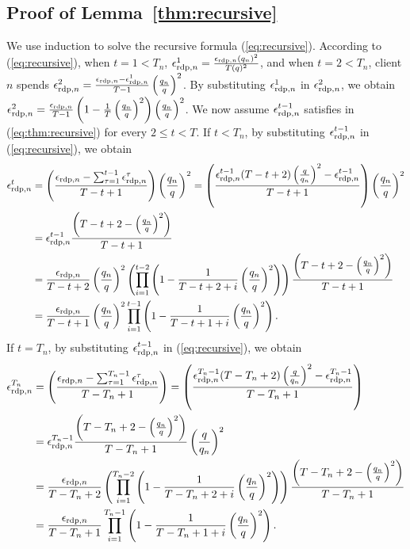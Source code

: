 \subsection{Proof of Lemma~\ref{thm:recursive}}\label{app:thm:recursive}
We use induction to solve the recursive formula (\ref{eq:recursive}). According to (\ref{eq:recursive}), when $t=1<T_n$, ${\epsilon}_{\text{rdp}, n}^1=\frac{{\epsilon}_{\text{rdp}, n}(q_n)^2}{T(q)^2}$, and when $t=2<T_n$, client $n$ spends ${\epsilon}_{\text{rdp}, n}^2 = \frac{{\epsilon}_{\text{rdp}, n}-{\epsilon}_{\text{rdp}, n}^1}{T-1} \left(\frac{q_n}{q}\right)^2$. By substituting ${\epsilon}_{\text{rdp}, n}^1$ in ${\epsilon}_{\text{rdp}, n}^2$, we obtain ${\epsilon}_{\text{rdp}, n}^2 = \frac{{\epsilon}_{\text{rdp}, n}}{T-1}\left(1-\frac{1}{T}\left(\frac{q_n}{q}\right)^2\right)\left(\frac{q_n}{q}\right)^2$. We now assume ${\epsilon}_{\text{rdp}, n}^{t-1}$ satisfies in (\ref{eq:thm:recursive}) for every $2 \leq t<T$. If $t< T_n$, by substituting ${\epsilon}_{\text{rdp}, n}^{t-1}$ in (\ref{eq:recursive}), we obtain
\begin{align}
    {\epsilon}_{\text{rdp}, n}^t &= \left(\frac{{\epsilon}_{\text{rdp}, n}-\sum_{\tau = 1}^{t-1} {\epsilon}_{\text{rdp}, n}^{\tau}}{T-t+1}\right)\left(\frac{q_n}{q}\right)^2
    = \left(\frac{{\epsilon}_{\text{rdp}, n}^{t-1}(T-t+2)\left(\frac{q}{q_n}\right)^2- {\epsilon}_{\text{rdp}, n}^{t-1}}{T-t+1}\right)\left(\frac{q_n}{q}\right)^2
    \\
    &= {\epsilon}_{\text{rdp}, n}^{t-1}\frac{\left(T-t+2-\left(\frac{q_n}{q}\right)^2\right)}{T-t+1}
    \\
    &= 
    \frac{{\epsilon}_{\text{rdp}, n}}{T-t+2}\left(\frac{q_n}{q}\right)^2\left(\prod_{i=1}^{t-2} \left(1-\frac{1}{T-t+2+i}\left(\frac{q_n}{q}\right)^2\right)\right)\frac{\left(T-t+2-\left(\frac{q_n}{q}\right)^2\right)}{T-t+1}
    \\
    &=
    \frac{{\epsilon}_{\text{rdp}, n}}{T-t+1}\left(\frac{q_n}{q}\right)^2\prod_{i=1}^{t-1} \left(1-\frac{1}{T-t+1+i}\left(\frac{q_n}{q}\right)^2\right).
\end{align}
If $t= T_n$, by substituting ${\epsilon}_{\text{rdp}, n}^{t-1}$ in (\ref{eq:recursive}), we obtain
\begin{align}
    {\epsilon}_{\text{rdp}, n}^{T_n} &= \left(\frac{{\epsilon}_{\text{rdp}, n}-\sum_{\tau = 1}^{T_n-1} {\epsilon}_{\text{rdp}, n}^{\tau}}{T-T_n+1}\right)
    = \left(\frac{{\epsilon}_{\text{rdp}, n}^{T_n-1}(T-T_n+2)\left(\frac{q}{q_n}\right)^2- {\epsilon}_{\text{rdp}, n}^{T_n-1}}{T-T_n+1}\right)
    \\
    &= {\epsilon}_{\text{rdp}, n}^{T_n-1}\frac{\left(T-T_n+2-\left(\frac{q_n}{q}\right)^2\right)}{T-T_n+1}\left(\frac{q}{q_n}\right)^2
    \\
    &= 
    \frac{{\epsilon}_{\text{rdp}, n}}{T-T_n+2}\left(\prod_{i=1}^{T_n-2} \left(1-\frac{1}{T-T_n+2+i}\left(\frac{q_n}{q}\right)^2\right)\right)\frac{\left(T-T_n+2-\left(\frac{q_n}{q}\right)^2\right)}{T-T_n+1}
    \\
    &=
    \frac{{\epsilon}_{\text{rdp}, n}}{T-T_n+1}\prod_{i=1}^{T_n-1} \left(1-\frac{1}{T-T_n+1+i}\left(\frac{q_n}{q}\right)^2\right).
\end{align}

